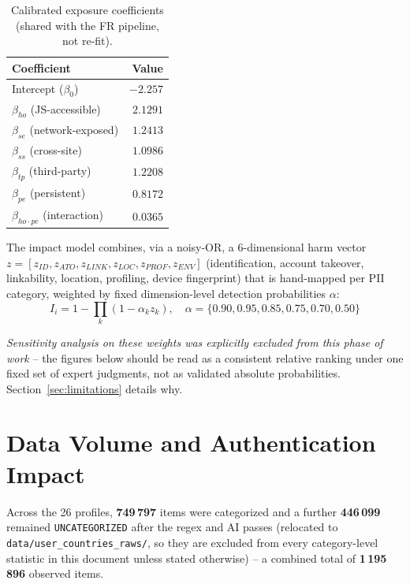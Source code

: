 \documentclass[11pt,a4paper]{article}
\newcommand{\code}[1]{\texttt{#1}}
\begin{document}
\begin{table}[h]
\centering
\caption{Calibrated exposure coefficients (shared with the FR pipeline, not re-fit).}
\label{tab:betas}
\begin{tabular}{lr}
\toprule
Coefficient & Value \\
\midrule
Intercept ($\beta_0$)                       & $-2.257$ \\
$\beta_{ho}$ (JS-accessible)                & $2.1291$ \\
$\beta_{se}$ (network-exposed)              & $1.2413$ \\
$\beta_{ss}$ (cross-site)                   & $1.0986$ \\
$\beta_{tp}$ (third-party)                  & $1.2208$ \\
$\beta_{pe}$ (persistent)                   & $0.8172$ \\
$\beta_{ho\cdot pe}$ (interaction)          & $0.0365$ \\
\bottomrule
\end{tabular}
\end{table}

The impact model combines, via a noisy-OR, a 6-dimensional harm vector
$z = [z_{ID}, z_{ATO}, z_{LINK}, z_{LOC}, z_{PROF}, z_{ENV}]$ (identification,
account takeover, linkability, location, profiling, device fingerprint) that
is hand-mapped per PII category, weighted by fixed dimension-level detection
probabilities $\alpha$:
\begin{equation}
I_i = 1 - \prod_{k} (1 - \alpha_k z_k), \quad
\alpha = \{0.90, 0.95, 0.85, 0.75, 0.70, 0.50\}
\end{equation}

\emph{Sensitivity analysis on these weights was explicitly excluded from this
phase of work} -- the figures below should be read as a consistent relative
ranking under one fixed set of expert judgments, not as validated absolute
probabilities. Section~\ref{sec:limitations} details why.

\section{Data Volume and Authentication Impact}

Across the 26 profiles, \textbf{749\,797} items were categorized and a
further \textbf{446\,099} remained \code{UNCATEGORIZED} after the regex and
AI passes (relocated to \code{data/user\_countries\_raws/}, so they are
excluded from every category-level statistic in this document unless stated
otherwise) -- a combined total of \textbf{1\,195\,896} observed items.
\end{document}
